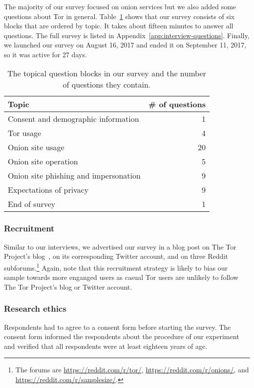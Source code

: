 The majority of our survey focused on onion services but we also added some
questions about Tor in general.  Table~\ref{tab:survey-structure} shows that our
survey consists of six blocks that are ordered by topic.  It takes about fifteen
minutes to answer all questions.  The full survey is listed in
Appendix~\ref{app:interview-questions}.  Finally, we launched our survey on
August 16, 2017 and ended it on September 11, 2017, so it was active for 27
days.

\begin{table}[t]
	\centering
	\begin{tabular}{l r}
	\toprule
	Topic & \# of questions \\
	\midrule
	Consent and demographic information & 1 \\
	Tor usage & 4 \\
	Onion site usage & 20 \\
	Onion site operation & 5 \\
	Onion site phishing and impersonation & 9 \\
	Expectations of privacy & 9 \\
	End of survey & 1 \\
	\bottomrule
	\end{tabular}
	\caption{The topical question blocks in our survey and the number of
	questions they contain.}
	\label{tab:survey-structure}
\end{table}

\subsubsection{Recruitment}

Similar to our interviews, we advertised our survey in a blog post on The Tor
Project's blog~\cite{Winter2017a}, on its corresponding Twitter account, and on
three Reddit subforums.\footnote{The forums are \url{https://reddit.com/r/tor/},
\url{https://reddit.com/r/onions/}, and \url{https://reddit.com/r/samplesize/}.}
Again, note that this recruitment strategy is likely to bias our sample towards
more enganged users as casual Tor users are unlikely to follow The Tor Project's
blog or Twitter account.

\subsubsection{Research ethics}
Respondents had to agree to a consent form before starting the survey. The
consent form informed the respondents about the procedure of our experiment and
verified that all respondents were at least eighteen years of age.

